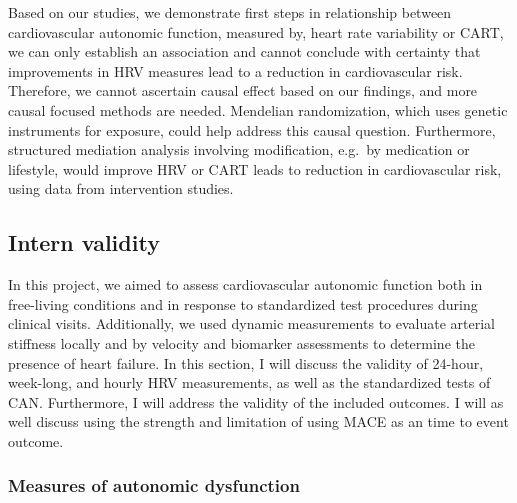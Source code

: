 \documentclass[
  a4paper,
  headsepline=true,
  open=any]{scrbook}
\begin{document}
Based on our studies, we demonstrate first steps in relationship between
cardiovascular autonomic function, measured by, heart rate variability
or CART, we can only establish an association and cannot conclude with
certainty that improvements in HRV measures lead to a reduction in
cardiovascular risk. Therefore, we cannot ascertain causal effect based
on our findings, and more causal focused methods are needed. Mendelian
randomization, which uses genetic instruments for exposure, could help
address this causal question. Furthermore, structured mediation analysis
involving modification, e.g.~by medication or lifestyle, would improve
HRV or CART leads to reduction in cardiovascular risk, using data from
intervention studies.

\hypertarget{intern-validity}{%
\subsection{Intern validity}\label{intern-validity}}

In this project, we aimed to assess cardiovascular autonomic function
both in free-living conditions and in response to standardized test
procedures during clinical visits. Additionally, we used dynamic
measurements to evaluate arterial stiffness locally and by velocity and
biomarker assessments to determine the presence of heart failure. In
this section, I will discuss the validity of 24-hour, week-long, and
hourly HRV measurements, as well as the standardized tests of CAN.
Furthermore, I will address the validity of the included outcomes. I
will as well discuss using the strength and limitation of using MACE as
an time to event outcome.

\hypertarget{measures-of-autonomic-dysfunction}{%
\subsubsection{Measures of autonomic
dysfunction}\label{measures-of-autonomic-dysfunction}}
\end{document}
